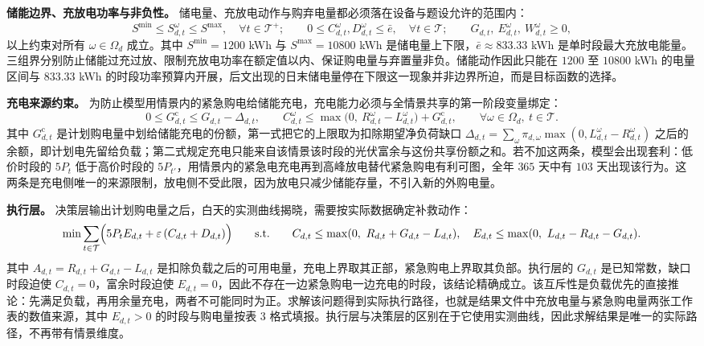 \textbf{储能边界、充放电功率与非负性。} 储电量、充放电动作与购弃电量都必须落在设备与题设允许的范围内：
\begin{equation}
S^{\min} \le S_{d,t}^{\omega} \le S^{\max}, \quad \forall t \in \mathcal{T}^+; \qquad
0 \le C_{d,t}^{\omega}, D_{d,t}^{\omega} \le \bar{e}, \quad \forall t \in \mathcal{T}; \qquad
G_{d,t},\ E_{d,t}^{\omega},\ W_{d,t}^{\omega} \ge 0,\label{eq:bound2}
\end{equation}
以上约束对所有 $\omega \in \Omega_d$ 成立。其中 $S^{\min}=1200$ kWh 与 $S^{\max}=10800$ kWh 是储电量上下限，$\bar e\approx833.33$ kWh 是单时段最大充放电能量。三组界分别防止储能过充过放、限制充放电功率在额定值以内、保证购电量与弃置量非负。储能动作因此只能在 $1200$ 至 $10800$ kWh 的电量区间与 $833.33$ kWh 的时段功率预算内开展，后文出现的日末储电量停在下限这一现象并非边界所迫，而是目标函数的选择。

\textbf{充电来源约束。} 为防止模型用情景内的紧急购电给储能充电，充电能力必须与全情景共享的第一阶段变量绑定：
\begin{equation}
0 \le G^{\mathrm{c}}_{d,t} \le G_{d,t} - \Delta_{d,t}, \qquad
C_{d,t}^{\omega} \le \max\bigl(0,\ R_{d,t}^{\omega} - L_{d,t}^{\omega}\bigr) + G^{\mathrm{c}}_{d,t},
\qquad \forall \omega \in \Omega_d,\ t \in \mathcal{T}.\label{eq:charge2}
\end{equation}
其中 $G^{\mathrm{c}}_{d,t}$ 是计划购电量中划给储能充电的份额，第一式把它的上限取为扣除期望净负荷缺口 $\Delta_{d,t}=\sum_\omega\pi_{d,\omega}\max(0,L^{\omega}_{d,t}-R^{\omega}_{d,t})$ 之后的余额，即计划电先留给负载；第二式规定充电只能来自该情景该时段的光伏富余与这份共享份额之和。若不加这两条，模型会出现套利：低价时段的 $5P_t$ 低于高价时段的 $5P_{t'}$，用情景内的紧急电充电再到高峰放电替代紧急购电有利可图，全年 $365$ 天中有 $103$ 天出现该行为。这两条是充电侧唯一的来源限制，放电侧不受此限，因为放电只减少储能存量，不引入新的外购电量。

\textbf{执行层。} 决策层输出计划购电量之后，白天的实测曲线揭晓，需要按实际数据确定补救动作：
\begin{equation}
\min \sum_{t \in \mathcal{T}} \Bigl(5 P_t E_{d,t} + \varepsilon\,(C_{d,t}+D_{d,t})\Bigr)
\qquad\text{s.t.}\qquad
C_{d,t} \le \max(0,\ R_{d,t}+G_{d,t}-L_{d,t}),\quad
E_{d,t} \le \max(0,\ L_{d,t}-R_{d,t}-G_{d,t}).\label{eq:exec2}
\end{equation}
其中 $A_{d,t}=R_{d,t}+G_{d,t}-L_{d,t}$ 是扣除负载之后的可用电量，充电上界取其正部，紧急购电上界取其负部。执行层的 $G_{d,t}$ 是已知常数，缺口时段迫使 $C_{d,t}=0$，富余时段迫使 $E_{d,t}=0$，因此不存在一边紧急购电一边充电的时段，该结论精确成立。该互斥性是负载优先的直接推论：先满足负载，再用余量充电，两者不可能同时为正。求解该问题得到实际执行路径，也就是结果文件中充放电量与紧急购电量两张工作表的数值来源，其中 $E_{d,t}>0$ 的时段与购电量按表 3 格式填报。执行层与决策层的区别在于它使用实测曲线，因此求解结果是唯一的实际路径，不再带有情景维度。

